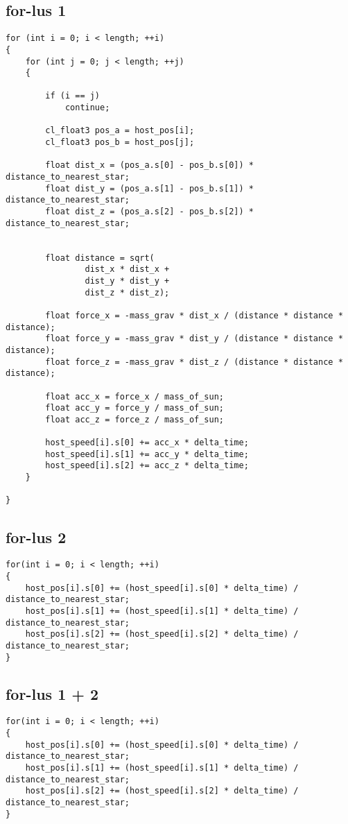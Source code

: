 \documentclass{article}
\begin{document}
\subsection{for-lus 1}
\begin{lstlisting}[breaklines=true]
for (int i = 0; i < length; ++i)
{
    for (int j = 0; j < length; ++j)
    {

        if (i == j)
            continue;

        cl_float3 pos_a = host_pos[i];
        cl_float3 pos_b = host_pos[j];

        float dist_x = (pos_a.s[0] - pos_b.s[0]) * distance_to_nearest_star;
        float dist_y = (pos_a.s[1] - pos_b.s[1]) * distance_to_nearest_star;
        float dist_z = (pos_a.s[2] - pos_b.s[2]) * distance_to_nearest_star;


        float distance = sqrt(
                dist_x * dist_x +
                dist_y * dist_y +
                dist_z * dist_z);

        float force_x = -mass_grav * dist_x / (distance * distance * distance);
        float force_y = -mass_grav * dist_y / (distance * distance * distance);
        float force_z = -mass_grav * dist_z / (distance * distance * distance);

        float acc_x = force_x / mass_of_sun;
        float acc_y = force_y / mass_of_sun;
        float acc_z = force_z / mass_of_sun;

        host_speed[i].s[0] += acc_x * delta_time;
        host_speed[i].s[1] += acc_y * delta_time;
        host_speed[i].s[2] += acc_z * delta_time;
    }

}
\end{lstlisting}

\subsection{for-lus 2}
\begin{lstlisting}[breaklines=true]
for(int i = 0; i < length; ++i)
{
    host_pos[i].s[0] += (host_speed[i].s[0] * delta_time) / distance_to_nearest_star;
    host_pos[i].s[1] += (host_speed[i].s[1] * delta_time) / distance_to_nearest_star;
    host_pos[i].s[2] += (host_speed[i].s[2] * delta_time) / distance_to_nearest_star;
}
\end{lstlisting}

\subsection{for-lus 1 + 2}
\begin{lstlisting}[breaklines=true]
for(int i = 0; i < length; ++i)
{
    host_pos[i].s[0] += (host_speed[i].s[0] * delta_time) / distance_to_nearest_star;
    host_pos[i].s[1] += (host_speed[i].s[1] * delta_time) / distance_to_nearest_star;
    host_pos[i].s[2] += (host_speed[i].s[2] * delta_time) / distance_to_nearest_star;
}
\end{lstlisting}
\end{document}
